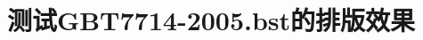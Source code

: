 \documentclass[adobefonts]{ctexart}
\begin{document}
\title{测试GBT7714-2005.bst的排版效果}
\maketitle

\Blindtext


\nocite{*}

\end{document}
